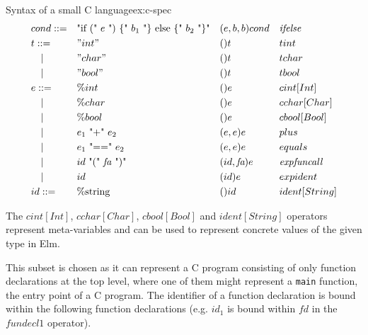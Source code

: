 \begin{example}[breakable]{Syntax of a small C language}{ex:c-spec}
\[\begin{aligned}
       & cond ::=        &  & \text{"if (" $e$ ") \{" $b_1$ "\} else \{" $b_2$ "\}"} &  & (e,b,b)cond                   &  & \textit{ifelse}      \\
       & t ::=           &  & "int"                                                  &  & ()t                           &  & tint                 \\
       & \quad |         &  & "char"                                                 &  & ()t                           &  & tchar                \\
       & \quad |         &  & "bool"                                                 &  & ()t                           &  & tbool                \\
       & e ::=           &  & \%int                                                  &  & ()e                           &  & cint[Int]            \\
       & \quad |         &  & \%char                                                 &  & ()e                           &  & cchar[Char]          \\
       & \quad |         &  & \%bool                                                 &  & ()e                           &  & cbool[Bool]          \\
       & \quad |         &  & \text{$e_1$ "+" $e_2$}                                 &  & (e,e)e                        &  & plus                 \\
       & \quad |         &  & \text{$e_1$ "==" $e_2$}                                &  & (e,e)e                        &  & equals               \\
       & \quad |         &  & \text{$id$ "(" \textit{fa} ")"}                        &  & (id,\textit{fa})e             &  & \textit{expfuncall}  \\
       & \quad |         &  & \text{$id$}                                            &  & (id)e                         &  & expident             \\
       & id ::=          &  & \%\text{string}                                        &  & ()id                          &  & ident[String]        \\
    \end{aligned}
  \]


  The $cint[Int]$, $cchar[Char]$, $cbool[Bool]$ and $ident[String]$ operators represent meta-variables and can be used to represent concrete values of the given type in Elm.

  This subset is chosen as it can represent a C program consisting of only function declarations at the top level, where one of them might represent a \texttt{main} function, the entry point of a C program. The identifier of a function declaration is bound within the following function declarations (e.g. $id_1$ is bound within $\textit{fd}$ in the $\textit{fundecl1}$ operator).


\end{example}
